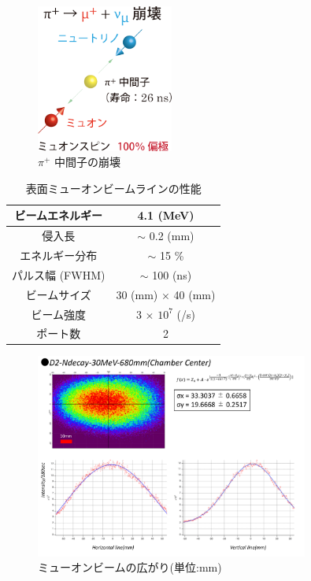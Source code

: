 \begin{figure}[H]
  \centering
  \includegraphics[width=0.4\textwidth]{figure/hayakawa/decay_pion.png}
  \caption{$\pi^+$ 中間子の崩壊}
\end{figure}

  

      
  \begin{table}[H]
    \caption{表面ミューオンビームラインの性能}
    \label{muon1}
    \centering
    \begin{tabular}{|c|c|}\hline
      ビームエネルギー & 4.1 (MeV) \\ \hline
      侵入長 & $\sim$ 0.2 (mm) \\ \hline
      エネルギー分布 & $\sim$ 15  \% \\ \hline
      パルス幅 (FWHM) & $\sim$ 100 (ns) \\ \hline
      ビームサイズ & 30 (mm) $\times$ 40 (mm) \\ \hline
      ビーム強度 & 3 $\times$ $10^7$ (/s) \\ \hline
      ポート数 & 2 \\ \hline
    \end{tabular}
  \end{table}
   
  \begin{figure}[H]
    \centering
    \includegraphics[width=0.8\textwidth]{figure/hayakawa/profile.pdf}
    \caption{ミューオンビームの広がり(単位:$\mathrm{mm}$)}
    \label{muon2}
  \end{figure}
  
